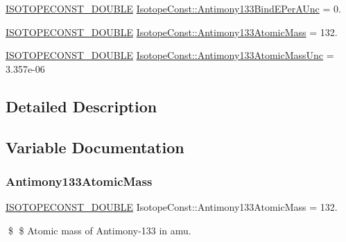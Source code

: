 \begin{DoxyCompactItemize}
\mbox{\hyperlink{group___isotope_const-_macros_ga8f45a7272ce02c0b4c65c44636ed719a}{I\+S\+O\+T\+O\+P\+E\+C\+O\+N\+S\+T\+\_\+\+D\+O\+U\+B\+LE}} \mbox{\hyperlink{group___isotope_const-_antimony-_sb133_gaf8b1582353d0f23dd9b2b78333ee6e88}{Isotope\+Const\+::\+Antimony133\+Bind\+E\+Per\+A\+Unc}} = 0.
\item 
\mbox{\hyperlink{group___isotope_const-_macros_ga8f45a7272ce02c0b4c65c44636ed719a}{I\+S\+O\+T\+O\+P\+E\+C\+O\+N\+S\+T\+\_\+\+D\+O\+U\+B\+LE}} \mbox{\hyperlink{group___isotope_const-_antimony-_sb133_ga3cac6cbbaf7dfcb3cc0b46c8c7603768}{Isotope\+Const\+::\+Antimony133\+Atomic\+Mass}} = 132.
\item 
\mbox{\hyperlink{group___isotope_const-_macros_ga8f45a7272ce02c0b4c65c44636ed719a}{I\+S\+O\+T\+O\+P\+E\+C\+O\+N\+S\+T\+\_\+\+D\+O\+U\+B\+LE}} \mbox{\hyperlink{group___isotope_const-_antimony-_sb133_gaca538e89cfed20a7c80a5325c60b4925}{Isotope\+Const\+::\+Antimony133\+Atomic\+Mass\+Unc}} = 3.\+357e-\/06
\end{DoxyCompactItemize}


\subsection{Detailed Description}


\subsection{Variable Documentation}
\mbox{\label{group___isotope_const-_antimony-_sb133_ga3cac6cbbaf7dfcb3cc0b46c8c7603768}} 
\subsubsection{\texorpdfstring{Antimony133\+Atomic\+Mass}{Antimony133AtomicMass}}
{\footnotesize\ttfamily \mbox{\hyperlink{group___isotope_const-_macros_ga8f45a7272ce02c0b4c65c44636ed719a}{I\+S\+O\+T\+O\+P\+E\+C\+O\+N\+S\+T\+\_\+\+D\+O\+U\+B\+LE}} Isotope\+Const\+::\+Antimony133\+Atomic\+Mass = 132.}

\$ \$ Atomic mass of Antimony-\/133 in amu. \mbox{\label{group___isotope_const-_antimony-_sb133_gaca538e89cfed20a7c80a5325c60b4925}} 
